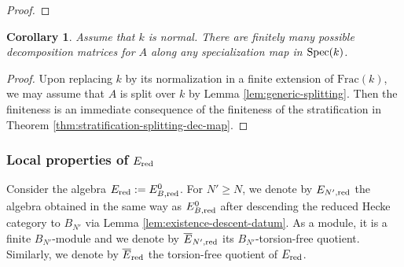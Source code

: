 \documentclass[a4paper, 10pt, oneside, reqno]{amsart}
\theoremstyle{plain}
\newtheorem{corol}[thm]{Corollary}
\theoremstyle{definition}
\theoremstyle{remark}
\newcommand{\Frac}{\mathrm{Frac}}
\begin{document}
\begin{proof}

\end{proof}

\begin{corol}\label{corol:finiteness-decomposition-matrices}
Assume that $k$ is normal. There are finitely many possible decomposition matrices for $A$ along any specialization map in $\mathrm{Spec}(k)$. 
\end{corol}

\begin{proof}
Upon replacing $k$ by its normalization in a finite extension of $\Frac(k)$, we may assume that $A$ is split over $k$ by Lemma \ref{lem:generic-splitting}. Then the finiteness is an immediate consequence of the finiteness of the stratification in Theorem \ref{thm:stratification-splitting-dec-map}.
\end{proof}



\subsubsection{Local properties of $E_{\mathrm{red}}$}

Consider the algebra $E_{\mathrm{red}} := E_{B,\mathrm{red}}^0$. For $N' \geq N$, we denote by $E_{N', \mathrm{red}}$ the algebra obtained in the same way as $E_{B, \mathrm{red}}^0$ after descending the reduced Hecke category to $B_{N'}$ via Lemma \ref{lem:existence-descent-datum}. As a module, it is a finite $B_{N'}$-module and we denote by $\overline{E}_{N', \mathrm{red}}$ its $B_{N'}$-torsion-free quotient. Similarly, we denote by $\overline{E}_{\mathrm{red}}$ the torsion-free quotient of $E_{\mathrm{red}}$. 
\end{document}
